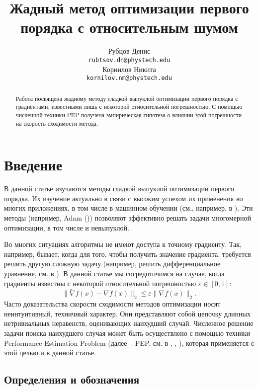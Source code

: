 \documentclass{article}
\title{Жадный метод оптимизации первого порядка с относительным шумом}
\author{
	Рубцов Денис \\
	\texttt{rubtsov.dn@phystech.edu} \\
	\And
	Корнилов Никита \\
	\texttt{kornilov.nm@phystech.edu} \\
}
\date{}
\begin{document}
\maketitle

\begin{abstract}
Работа посвящена жадному методу гладкой выпуклой оптимизации первого порядка с градиентами, известными лишь с некоторой относительной погрешностью. С помощью численной техники PEP получена эмпирическая гипотеза о влиянии этой погрешности на скорость сходимости метода. 

\end{abstract}



\section{Введение}

В данной статье изучаются методы гладкой выпуклой оптимизации первого порядка. Их изучение актуально в связи с высоким успехом их применения во многих приложениях, в том числе в машинном обучении (см., например, в \cite{bottou2007tradeoffs}). Эти методы (например, Adam (\cite{kingma2014adam})) позволяют эффективно решать задачи многомерной оптимизации, в том числе и невыпуклой.

Во многих ситуациях алгоритмы не имеют доступа к точному градиенту. Так, например, бывает, когда для того, чтобы получить значение градиента, требуется решить другую сложную задачу (например, решить дифференциальное уравнение, см. в \cite{matyukhin2021convex}). В данной статье мы сосредоточимся на случае, когда градиенты известны с некоторой относительной погрешностью $\varepsilon \in [0, 1]$: $$\|\widetilde{\nabla} f(x) - \nabla f(x)\|_2 \leq \varepsilon \|\nabla f(x)\|_2.$$
Часто доказательства скорости сходимости методов оптимизации носят неинтуитивный, техничный характер. Они представляют собой цепочку длинных нетривиальных неравенств, оценивающих наихудший случай. Численное решение задачи поиска наихудшего случая может быть осуществлено с помощью техники Performance Estimation Problem (далее -- PEP, см. в \cite{goujaud2022pepit}, \cite{taylor2017smooth}, \cite{taylor2017convex}), которая применяется с этой целью и в данной статье.

\subsection{Определения и обозначения}
\end{document}
